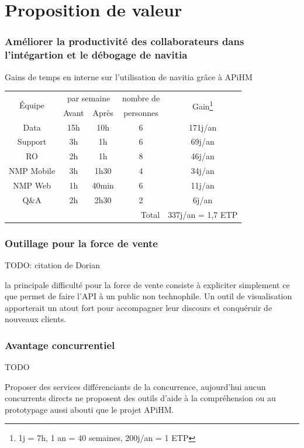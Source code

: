 \documentclass[table]{beamer}
\begin{document}
\section{Proposition de valeur}

\begin{frame}
  \frametitle{Améliorer la productivité des collaborateurs dans
    l'intégartion et le débogage de navitia}

  \centering Gains de temps en interne sur l'utilisation de navitia
  grâce à APiHM
  \vfill
  \begin{tabular}{|c|c|c|c|c|}
    \hline
    \multirow{2}{*}{Équipe}& \multicolumn{2}{c|}{par
      semaine}&nombre de&\multirow{2}{*}{Gain\footnote{1j = 7h,
        1 an = 40 semaines, 200j/an = 1 ETP}}\\
    \hhline{~--~~}
    & Avant & Après & personnes &\\
    \hline
    Data       &15h &10h & 6 & 171j/an\\
    Support    & 3h & 1h & 6 &  69j/an\\
    RO         & 2h & 1h & 8 &  46j/an\\
    NMP Mobile & 3h &1h30& 4 &  34j/an\\
    NMP Web    & 1h &40min&6 &  11j/an\\
    Q\&A       & 2h &2h30& 2 &   6j/an\\
    \hline
    \multicolumn{4}{|r|}{Total} &
    337j/an = 1{,}7 ETP\\
    \hline
  \end{tabular}
\end{frame}

\begin{frame}
  \frametitle{Outillage pour la force de vente}

  TODO: citation de Dorian

  la principale difficulté pour la force de vente consiste à
  expliciter simplement ce que permet de faire l'API à un public non
  technophile. Un outil de visualisation apporterait un atout fort
  pour accompagner leur discours et conquéruir de nouveaux clients.
\end{frame}

\begin{frame}
  \frametitle{Avantage concurrentiel}

  TODO

  Proposer des services différenciants de la concurrence, aujourd'hui
  aucun concurrents directs ne proposent des outils d'aide à la
  compréhension ou au prototypage aussi abouti que le projet APiHM.
\end{frame}
\end{document}
